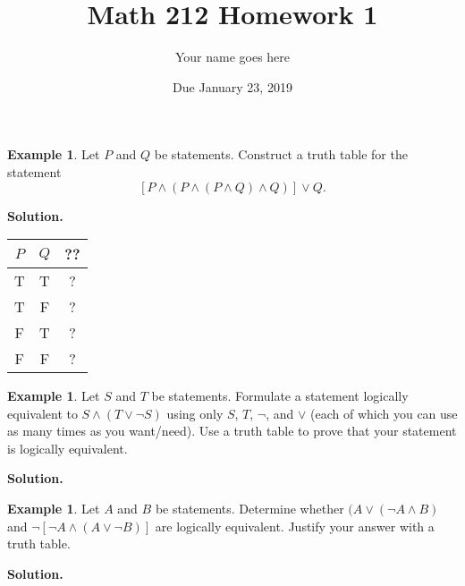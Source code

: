 \documentclass[11pt]{article}		%
\title{Math 212 Homework 1}
\author{Your name goes here}
\date{Due January 23, 2019}
\theoremstyle{definition}
\newtheorem{example}[theorem]{Example}
\begin{document}
\maketitle



\begin{example}
	Let $P$ and $Q$ be statements.
	Construct a truth table for the statement
	\[
		[P \land (P\land (P\land Q) \land Q)] \lor Q.
	\]
\end{example}


\noindent\textbf{Solution.} 

\begin{table}[htp]
\begin{center}
\begin{tabular}{c|c|c} %

$P$ & $Q$ 	& ?? \\\hline
T 	& T		& ?  \\
T	& F 	& ?  \\
F	& T		& ?	 \\
F	& F		& ? 
\end{tabular}
\end{center}
\end{table}%



\begin{example}
	Let $S$ and $T$ be statements. 
	Formulate a statement logically equivalent to $S\land (T\lor \neg S)$ using only $S$, $T$, $\neg$, and $\lor$ (each of which you can use as many times as you want/need).
	Use a truth table to prove that your statement is logically equivalent.
\end{example}

\noindent\textbf{Solution.} 


\begin{example}
	Let $A$ and $B$ be statements.
	Determine whether $(A\lor (\neg A \land B)$ and $\neg [ \neg A \land (A\lor \neg B)]$ are logically equivalent.
	Justify your answer with a truth table.
\end{example}

\noindent\textbf{Solution.} 
\end{document}
